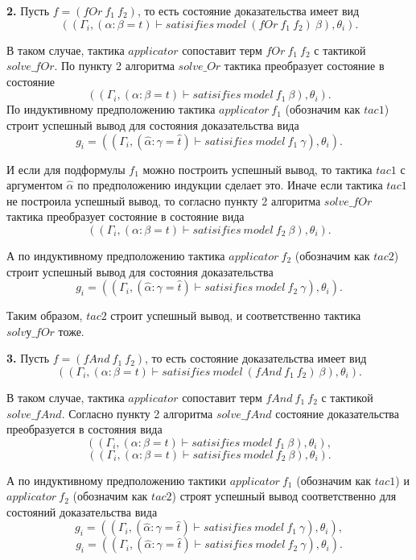 \documentclass[12pt]{article}
\begin{document}
\textbf{2.} Пусть $f=(fOr\ f_1\ f_2)$, то есть состояние доказательства имеет вид
$$((\Gamma_i, (\alpha: \beta=t) \vdash satisifies\ model\ (fOr\ f_1\ f_2)\ \beta), \theta_i).$$

В таком случае, тактика $applicator$ сопоставит терм $fOr\ f_1\ f_2$ с тактикой $solve\_fOr$.
По пункту 2 алгоритма $solve\_Or$ тактика преобразует состояние в состояние 
$$((\Gamma_i, (\alpha: \beta=t) \vdash satisifies\ model\ f_1\ \beta), \theta_i).$$
По индуктивному предположению тактика $applicator\ f_1$ (обозначим как $tac1$) 
строит успешный вывод для состояния доказательства вида
$$g_i = ((\Gamma_i, (\hat{\alpha}: \gamma=\hat{t}) \vdash satisifies\ model\ f_1\ \gamma), \theta_i).$$

И если для подформулы $f_1$ можно построить успешный вывод, то тактика $tac1$ с аргументом $\hat{\alpha}$ по предположению индукции сделает это.
Иначе если тактика $tac1$ не построила успешный вывод, то согласно пункту 2 алгоритма $solve\_fOr$ тактика преобразует состояние в состояние вида
$$((\Gamma_i, (\alpha: \beta=t) \vdash satisifies\ model\ f_2\ \beta), \theta_i).$$ 

А по индуктивному предположению тактика $applicator\ f_2$ (обозначим как $tac2$) 
строит успешный вывод для состояния доказательства
$$g_i = ((\Gamma_i, (\hat{\alpha}: \gamma=\hat{t}) \vdash satisifies\ model\ f_2\ \gamma), \theta_i).$$

Таким образом, $tac2$ строит успешный вывод, и соответственно тактика $solvу\_fOr$ тоже.

\textbf{3.} Пусть $f=(fAnd\ f_1\ f_2)$, то есть состояние доказательства имеет вид
$$((\Gamma_i, (\alpha: \beta=t) \vdash satisifies\ model\ (fAnd\ f_1\ f_2)\ \beta), \theta_i).$$

В таком случае, тактика $applicator$ сопоставит терм $fAnd\ f_1\ f_2$ с тактикой $solve\_fAnd$.
Согласно пункту 2 алгоритма $solve\_fAnd$ состояние доказательства преобразуется в состояния вида
$$((\Gamma_i, (\alpha: \beta=t) \vdash satisifies\ model\ f_1\ \beta), \theta_i),$$
$$((\Gamma_i, (\alpha: \beta=t) \vdash satisifies\ model\ f_2\ \beta), \theta_i).$$

А по индуктивному предположению тактики $applicator\ f_1$ (обозначим как $tac1$)  и $applicator\ f_2$ (обозначим как $tac2$) 
строят успешный вывод соответственно для состояний доказательства вида
$$g_i = ((\Gamma_i, (\hat{\alpha}: \gamma=\hat{t}) \vdash satisifies\ model\ f_1\ \gamma), \theta_i),$$
$$g_i = ((\Gamma_i, (\hat{\alpha}: \gamma=\hat{t}) \vdash satisifies\ model\ f_2\ \gamma), \theta_i).$$
\end{document}
